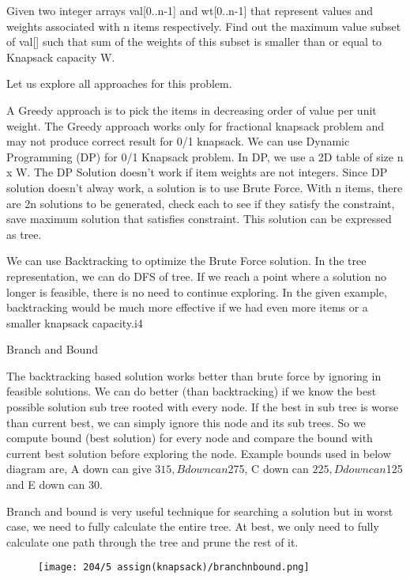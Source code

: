 \documentclass{article}
\begin{document}
	Given two integer arrays val[0..n-1] and wt[0..n-1] that represent values and weights associated with n items respectively. Find out the maximum value subset of val[] such that sum of the weights of this subset is smaller than or equal to Knapsack capacity W.
	
	Let us explore all approaches for this problem.
	
	A Greedy approach is to pick the items in decreasing order of value per unit weight. The Greedy approach works only for fractional knapsack problem and may not produce correct result for 0/1 knapsack.
	We can use Dynamic Programming (DP) for 0/1 Knapsack problem. In DP, we use a 2D table of size n x W. The DP Solution doesn’t work if item weights are not integers.
	Since DP solution doesn’t alway work, a solution is to use Brute Force. With n items, there are 2n solutions to be generated, check each to see if they satisfy the constraint, save maximum solution that satisfies constraint. This solution can be expressed as tree.
	
	We can use Backtracking to optimize the Brute Force solution. In the tree representation, we can do DFS of tree. If we reach a point where a solution no longer is feasible, there is no need to continue exploring. In the given example, backtracking would be much more effective if we had even more items or a smaller knapsack capacity.i4
	
	
	Branch and Bound
	
	The backtracking based solution works better than brute force by ignoring in feasible solutions. We can do better (than backtracking) if we know the best possible solution sub tree rooted with every node. If the best in sub tree is worse than current best, we can simply ignore this node and its sub trees. So we compute bound (best solution) for every node and compare the bound with current best solution before exploring the node.
	Example bounds used in below diagram are, A down can give $315, B down can $275, C down can $225, D down can $125 and E down can 30.
	
	Branch and bound is very useful technique for searching a solution but in worst case, we need to fully calculate the entire tree. At best, we only need to fully calculate one path through the tree and prune the rest of it.
	
	
	\begin{figure}[h!]
		\centering
		\texttt{[image: 204/5 assign(knapsack)/branchnbound.png]}
	\end{figure}
	
\end{document}
